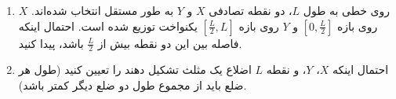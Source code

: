\problem{}
\begin{enumerate}
    \item روی خطی به طول $L$، دو نقطه تصادفی $X$ و $Y$ به طور مستقل انتخاب شده‌اند. $X$ روی بازه $[0, \frac{L}{2}]$ و $Y$ روی بازه $[\frac{L}{2}, L]$ یکنواخت توزیع شده است. احتمال اینکه فاصله بین این دو نقطه بیش از $\frac{L}{2}$ باشد، پیدا کنید.
    \item احتمال اینکه $X$، $Y$، و نقطه $L$ اضلاع یک مثلث تشکیل دهند را تعیین کنید (طول هر ضلع باید از مجموع طول دو ضلع دیگر کمتر باشد).
\end{enumerate}
